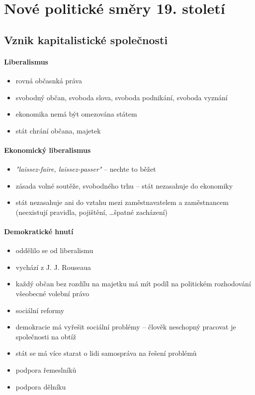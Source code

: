 \section{Nové politické směry 19. století}
\subsection{Vznik kapitalistické společnosti}
\paragraph{Liberalismus}
\begin{itemize}
\item rovná občasnká práva
\item svobodný občan, svoboda slova, svoboda podnikání, svoboda vyznání
\item ekonomika nemá být omezována státem
\item stát chrání občana, majetek
\end{itemize}

\paragraph{Ekonomický liberalismus}
\begin{itemize}
\item \textit{"laissez-faire, laissez-passer"} -- nechte to běžet
\item zásada volné soutěže, svobodného trhu -- stát nezasahuje do ekonomiky
\item  stát nezasahuje ani do vztahu mezi zaměstnavatelem a zaměstnancem (neexistují pravidla, pojištění, \ldots \ra špatné zacházení)
\end{itemize}

\paragraph{Demokratické hnutí}
\begin{itemize}
\item oddělilo se od liberalismu
\item vychází z J. J. Rouseaua
\item každý občan bez rozdílu na majetku má mít podíl na politickém rozhodování \ra všeobecné volební právo
\item sociální reformy
\item demokracie má vyřešit sociální problémy -- člověk neschopný pracovat je společnosti na obtíž
\item stát se má více starat o lidi \ra samospráva na řešení problémů
\item podpora řemeslníků
\item podpora dělníku
\end{itemize}

